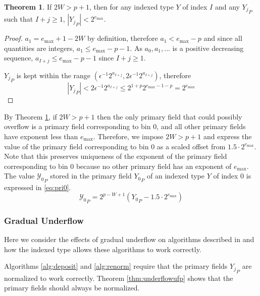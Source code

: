 \documentclass[12pt]{article}
\providecommand{\max}{\ensuremath{\text{max}}}
\theoremstyle{definition}
\newtheorem{thm}{Theorem}[section]
\numberwithin{equation}{section}
\numberwithin{figure}{section}
\begin{document}
      \begin{samepage}
      \begin{thm}
        If $2 W > p + 1$, then for any indexed type $Y$ of index $I$ and any ${Y_j}_P$ such that $I + j \geq 1$, $|{Y_j}_P| < 2^{e_{\max}}$.
        \label{thm:overflow}
      \end{thm}
    \end{samepage}

      \begin{proof}
        $a_1 = e_{\max} + 1 - 2 W$ by definition, therefore $a_1 < e_{\max} - p$ and since all quantities are integers, $a_1 \leq e_{\max} - p - 1$. As $a_0, a_1, ...$ is a positive decreasing sequence, $a_{I + j} \leq e_{\max} - p - 1$ since $I + j \geq 1$.

        ${Y_j}_P$ is kept within the range $(\epsilon^{-1} 2^{a_{I + j}}, 2 \epsilon^{-1} 2^{a_{I + j}})$, therefore
        \begin{equation*}
          |{Y_j}_P| < 2 \epsilon^{-1} 2^{a_{I + j}} \leq 2^{1 + p} 2^{e_{\max} - 1 - p} = 2^{e_{\max}}
        \end{equation*}
      \end{proof}
      By Theorem \ref{thm:overflow}, if $2 W > p + 1$ then the only primary field that could possibly overflow is a primary field corresponding to bin 0, and all other primary fields have exponent less than $e_{\max}$. Therefore, we impose $2 W > p + 1$ and express the value of the primary field corresponding to bin 0 as a scaled offset from $1.5\cdot2^{e_{\max}}$. Note that this preserves uniqueness of the exponent of the primary field corresponding to bin 0 because no other primary field has an exponent of $e_{\max}$. The value ${\mathcal{Y}_0}_P$ stored in the primary field ${Y_0}_P$ of an indexed type $Y$ of index 0 is expressed in \eqref{eq:pri0}.
      \begin{equation}
        {\mathcal{Y}_0}_P = 2^{p - W + 1}({Y_0}_P - 1.5\cdot2^{e_{\max}})
        \label{eq:pri0}
      \end{equation}
    \subsubsection{Gradual Underflow}
      \label{sec:indexed_underflow_gradual}
      Here we consider the effects of gradual underflow on algorithms described in \cite{repsum} and how the indexed type allows these algorithms to work correctly.

      Algorithms \ref{alg:deposit} and \ref{alg:renorm} require that the primary fields ${Y_j}_P$ are normalized to work correctly. Theorem \ref{thm:underflowufp} shows that the primary fields should always be normalized.
\end{document}

